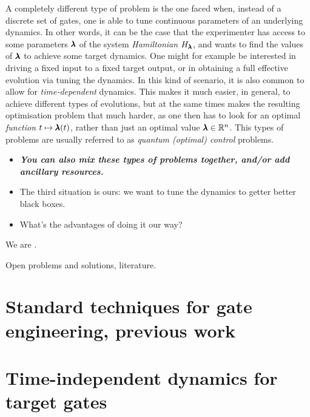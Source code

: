 A completely different type of problem is the one faced when, instead of a discrete set of gates, one is able to tune continuous parameters of an underlying dynamics.
In other words, it can be the case that the experimenter has access to some parameters $\pmb{\lambda}$ of the system \textit{Hamiltonian} $H_{\pmb{\lambda}}$, and wants to find the values of $\pmb{\lambda}$ to achieve some target dynamics.
One might for example be interested in driving a fixed input to a fixed target output, or in obtaining a full effective evolution via tuning the dynamics.
In this kind of scenario, it is also common to allow for \textit{time-dependent} dynamics. This makes it much easier, in general, to achieve different types of evolutions, but at the same times makes the resulting optimisation problem that much harder, as one then has to look for an optimal \textit{function} $t\mapsto\pmb{\lambda}(t)$, rather than just an optimal value $\pmb{\lambda}\in\mathbb R^n$.
This types of problems are usually referred to as \textit{quantum (optimal) control} problems.



\begin{itemize}
    \item \textbf{\textit{You can also mix these types of problems together, and/or add ancillary resources.}}
    \item The third situation is ours: we want to tune the dynamics to getter better black boxes.
    \item What's the advantages of doing it our way?
\end{itemize}

We are \cite{innocenti2018supervised}.

Open problems and solutions, literature.

\section{Standard techniques for gate engineering, previous work}

\section{Time-independent dynamics for target gates}

